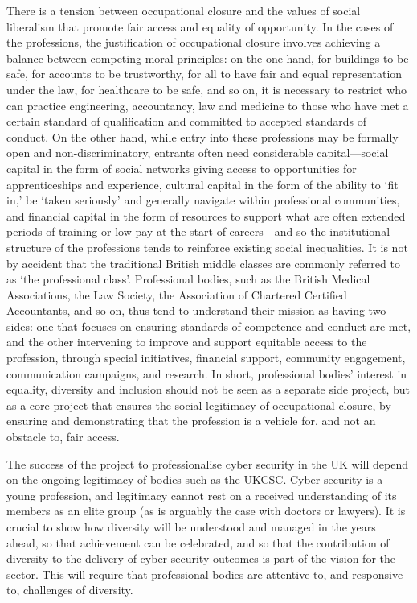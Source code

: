 \documentclass[
  a4paper,
]{book}
\begin{document}
There is a tension between occupational closure and the values of social
liberalism that promote fair access and equality of opportunity. In the
cases of the professions, the justification of occupational closure
involves achieving a balance between competing moral principles: on the
one hand, for buildings to be safe, for accounts to be trustworthy, for
all to have fair and equal representation under the law, for healthcare
to be safe, and so on, it is necessary to restrict who can practice
engineering, accountancy, law and medicine to those who have met a
certain standard of qualification and committed to accepted standards of
conduct. On the other hand, while entry into these professions may be
formally open and non-discriminatory, entrants often need considerable
capital---social capital in the form of social networks giving access to
opportunities for apprenticeships and experience, cultural capital in
the form of the ability to `fit in,' be `taken seriously' and generally
navigate within professional communities, and financial capital in the
form of resources to support what are often extended periods of training
or low pay at the start of careers---and so the institutional structure
of the professions tends to reinforce existing social inequalities. It
is not by accident that the traditional British middle classes are
commonly referred to as `the professional class'. Professional bodies,
such as the British Medical Associations, the Law Society, the
Association of Chartered Certified Accountants, and so on, thus tend to
understand their mission as having two sides: one that focuses on
ensuring standards of competence and conduct are met, and the other
intervening to improve and support equitable access to the profession,
through special initiatives, financial support, community engagement,
communication campaigns, and research. In short, professional bodies'
interest in equality, diversity and inclusion should not be seen as a
separate side project, but as a core project that ensures the social
legitimacy of occupational closure, by ensuring and demonstrating that
the profession is a vehicle for, and not an obstacle to, fair access.

The success of the project to professionalise cyber security in the UK
will depend on the ongoing legitimacy of bodies such as the UKCSC. Cyber
security is a young profession, and legitimacy cannot rest on a received
understanding of its members as an elite group (as is arguably the case
with doctors or lawyers). It is crucial to show how diversity will be
understood and managed in the years ahead, so that achievement can be
celebrated, and so that the contribution of diversity to the delivery of
cyber security outcomes is part of the vision for the sector. This will
require that professional bodies are attentive to, and responsive to,
challenges of diversity.
\end{document}
